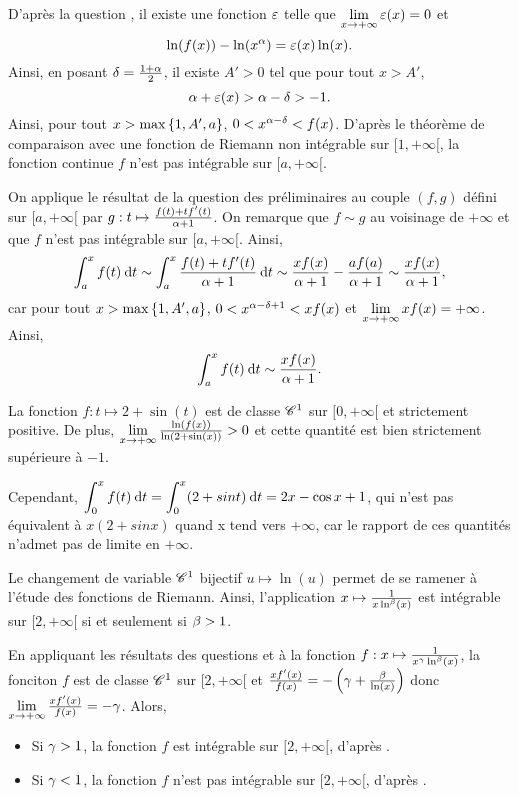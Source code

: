 \documentclass[oneside,11pt]{book}
\begin{document}
\begin{solution*}
\Qu D'après la question , il existe une fonction $\varepsilon$ telle que $\lim\limits_{x\to+\infty} \varepsilon(x) = 0$ et
\[
\ln(f(x)) - \ln(x^\alpha) = \varepsilon (x) \ln(x).
\]
Ainsi, en posant $\delta = \frac{1 + \alpha}{2}$, il existe $A' > 0$ tel que pour tout $x > A'$,
\[
\alpha + \varepsilon (x) > \alpha - \delta > - 1.
\]
Ainsi, pour tout $x > \max\left\{1, A', a\right\}$, $0 < x^{\alpha - \delta} < f(x)$. D'après le théorème de comparaison avec une fonction de Riemann non intégrable sur $[1, +\infty[$, la fonction continue $f$ n’est pas intégrable sur $[a, +\infty[$.

\squ On applique le résultat de la question  des préliminaires au couple $(f, g)$ défini sur $[a, +\infty[$ par $g : t \mapsto \frac{f(t) + tf'(t)}{\alpha+1}$. On remarque que $f \sim g$ au voisinage de $+\infty$ et que $f$ n’est pas intégrable sur $[a, +\infty[$. Ainsi,
\[
\displaystyle \int_a^x f(t) \:{\text d}t \sim \displaystyle \int_a^{x} \frac{f(t) + t f'(t)}{\alpha + 1} \:{\text d}t \sim \frac{x f(x)}{\alpha+1} - \frac{a f(a)}{\alpha+1} \sim \frac{x f(x)}{\alpha+1},
\]
car pour tout $x > \max\left\{1, A', a\right\}$, $0 < x^{\alpha-\delta+1} < x f(x)$ et $\lim\limits_{x\to+\infty} x f(x) = +\infty$. Ainsi,
\[
\displaystyle \int_a^x f(t) \:{\text d}t \sim \frac{x f(x)}{\alpha+1}.
\]

\squ La fonction $f : t \mapsto 2 + \sin(t)$ est de classe $\mathscr{C}^1$ sur $[0, +\infty[$ et strictement positive. De plus, $\lim\limits_{x\to+\infty} \frac{\ln(f(x))}{\ln(2 + \sin(x))} > 0$ et cette quantité est bien strictement supérieure à $-1$.

Cependant, $\displaystyle \int_0^x f(t) \:{\text d}t = \displaystyle \int_0^x (2 + sin t) \:{\text d}t = 2 x - \cos x + 1$, qui n’est pas équivalent à $x (2 + sin x)$ quand x tend vers $+\infty$, car le rapport de ces quantités n'admet pas de limite en $+\infty$.

\Qu Le changement de variable $\mathscr{C}^1$ bijectif $u \mapsto \ln(u)$ permet de se ramener à l’étude des fonctions de Riemann. Ainsi, l’application $x \mapsto \frac{1}{x \ln^\beta(x)}$ est intégrable sur $[2, +\infty[$ si et seulement si $\beta > 1$.


\squ En appliquant les résultats des questions  et  à la fonction $f : x \mapsto \frac{1}{x^\gamma \ln^\beta(x)}$, la fonciton $f$ est de classe $\mathscr{C}^1$ sur $[2, +\infty[$ et $\frac{x f'(x)}{f(x)} = -\left(\gamma + \frac{\beta}{\ln(x)}\right)$ donc $\lim\limits_{x\to+\infty} \frac{x f'(x)}{f(x)} = -\gamma$. Alors,
\begin{itemize}
\item Si $\gamma > 1$, la fonction $f$ est intégrable sur $[2, +\infty[$, d’après .
\item Si $\gamma < 1$, la fonction $f$ n’est pas intégrable sur $[2, +\infty[$, d’après .
\end{itemize}

\end{solution*}
\end{document}
